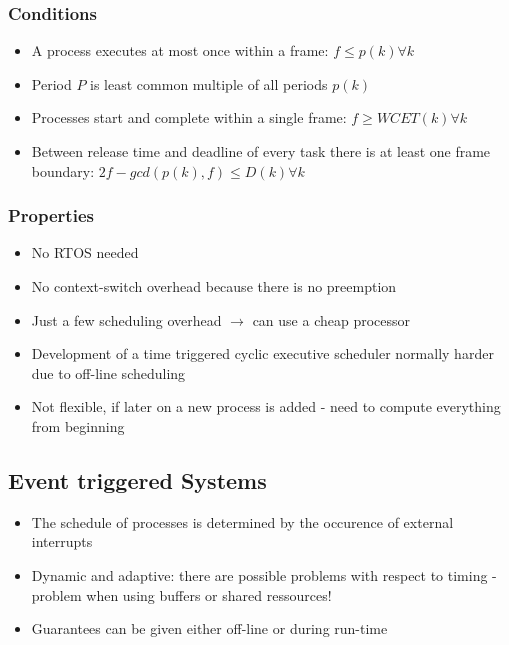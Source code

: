 \subsubsection{Conditions}

\begin{itemize}[noitemsep]
\item A process executes at most once within a frame: $f \leq p(k) \forall k$
\item Period $P$ is least common multiple of all periods $p(k)$
\item Processes start and complete within a single frame: $f \geq WCET(k) \forall k$
\item Between release time and deadline of every task there is at least one frame boundary: $2f - gcd(p(k), f) \leq D(k) \forall k$

\end{itemize}


\subsubsection{Properties}
\begin{itemize}[noitemsep]
\item No RTOS needed
\item No context-switch overhead because there is no preemption
\item Just a few scheduling overhead $\rightarrow$ can use a cheap processor
\item Development of a time triggered cyclic executive scheduler normally harder due to off-line scheduling
\item Not flexible, if later on a new process is added - need to compute everything from beginning
\end{itemize}


\subsection{Event triggered Systems}

\begin{itemize}[noitemsep]
\item The schedule of processes is determined by the occurence of external interrupts
\item Dynamic and adaptive: there are possible problems with respect to timing - problem when using buffers or shared ressources!
\item Guarantees can be given either off-line or during run-time
\end{itemize}


